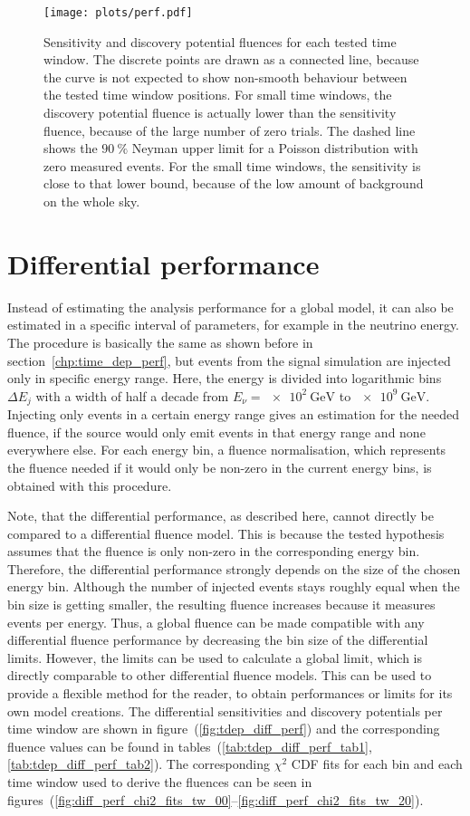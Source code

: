 \begin{figure}[htbp]
  \centering
  \texttt{[image: plots/perf.pdf]}
  \caption[Performance fluences for each time window]{
    Sensitivity and discovery potential fluences for each tested time window.
    The discrete points are drawn as a connected line, because the curve is not expected to show non-smooth behaviour between the tested time window positions.
    For small time windows, the discovery potential fluence is actually lower than the sensitivity fluence, because of the large number of zero trials.
    The dashed line shows the $\SI{90}{\percent}$ Neyman upper limit for a Poisson distribution with zero measured events.
    For the small time windows, the sensitivity is close to that lower bound, because of the low amount of background on the whole sky.
  }
  \label{fig:tdep_perf}
\end{figure}


\section{Differential performance}
  \label{chp:tdep_diff_perf}
Instead of estimating the analysis performance for a global model, it can also be estimated in a specific interval of parameters, for example in the neutrino energy.
The procedure is basically the same as shown before in section~\ref{chp:time_dep_perf}, but events from the signal simulation are injected only in specific energy range.
Here, the energy is divided into logarithmic bins $\Delta E_j$ with a width of half a decade from $E_\nu = \SI{e2}{\GeV}$ to $\SI{e9}{\GeV}$.
Injecting only events in a certain energy range gives an estimation for the needed fluence, if the source would only emit events in that energy range and none everywhere else.
For each energy bin, a fluence normalisation, which represents the fluence needed if it would only be non-zero in the current energy bins, is obtained with this procedure.

Note, that the differential performance, as described here, cannot directly be compared to a differential fluence model.
This is because the tested hypothesis assumes that the fluence is only non-zero in the corresponding energy bin.
Therefore, the differential performance strongly depends on the size of the chosen energy bin.
Although the number of injected events stays roughly equal when the bin size is getting smaller, the resulting fluence increases because it measures events per energy.
Thus, a global fluence can be made compatible with any differential fluence performance by decreasing the bin size of the differential limits.
However, the limits can be used to calculate a global limit, which is directly comparable to other differential fluence models.
This can be used to provide a flexible method for the reader, to obtain performances or limits for its own model creations.
The differential sensitivities and discovery potentials per time window are shown in figure~(\ref{fig:tdep_diff_perf}) and the corresponding fluence values can be found in tables~(\ref{tab:tdep_diff_perf_tab1}, \ref{tab:tdep_diff_perf_tab2}).
The corresponding $\chi^2$ CDF fits for each bin and each time window used to derive the fluences can be seen in figures~(\ref{fig:diff_perf_chi2_fits_tw_00}--\ref{fig:diff_perf_chi2_fits_tw_20}).

